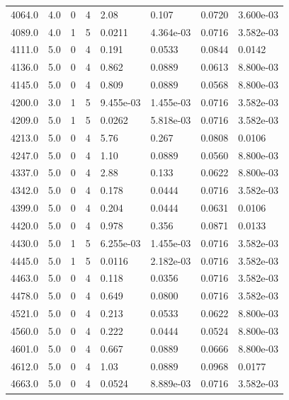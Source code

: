 \documentclass[preview]{standalone}
\begin{document}
{{{{\begin{tabular}{L{1.2cm}C{1.2cm} C{0.3cm}C{0.5cm} C{1.4cm}C{1.4cm} C{1.4cm}C{1.4cm}}
  4064.0  &   4.0  & 0     &  4 &  2.08  & 0.107  & 0.0720 &  3.600e-03   \\ 
  4089.0  &   4.0  & 1     &  5 &  0.0211  & 4.364e-03  & 0.0716 &  3.582e-03   \\ 
  4111.0  &   5.0  & 0     &  4 &  0.191  & 0.0533  & 0.0844 &  0.0142   \\ 
  4136.0  &   5.0  & 0     &  4 &  0.862  & 0.0889  & 0.0613 &  8.800e-03   \\ 
  4145.0  &   5.0  & 0     &  4 &  0.809  & 0.0889  & 0.0568 &  8.800e-03   \\ 
  4200.0  &   3.0  & 1     &  5 &  9.455e-03  & 1.455e-03  & 0.0716 &  3.582e-03   \\ 
  4209.0  &   5.0  & 1     &  5 &  0.0262  & 5.818e-03  & 0.0716 &  3.582e-03   \\ 
  4213.0  &   5.0  & 0     &  4 &  5.76  & 0.267  & 0.0808 &  0.0106   \\ 
  4247.0  &   5.0  & 0     &  4 &  1.10  & 0.0889  & 0.0560 &  8.800e-03   \\ 
  4337.0  &   5.0  & 0     &  4 &  2.88  & 0.133  & 0.0622 &  8.800e-03   \\ 
  4342.0  &   5.0  & 0     &  4 &  0.178  & 0.0444  & 0.0716 &  3.582e-03   \\ 
  4399.0  &   5.0  & 0     &  4 &  0.204  & 0.0444  & 0.0631 &  0.0106   \\ 
  4420.0  &   5.0  & 0     &  4 &  0.978  & 0.356  & 0.0871 &  0.0133   \\ 
  4430.0  &   5.0  & 1     &  5 &  6.255e-03  & 1.455e-03  & 0.0716 &  3.582e-03   \\ 
  4445.0  &   5.0  & 1     &  5 &  0.0116  & 2.182e-03  & 0.0716 &  3.582e-03   \\ 
  4463.0  &   5.0  & 0     &  4 &  0.118  & 0.0356  & 0.0716 &  3.582e-03   \\ 
  4478.0  &   5.0  & 0     &  4 &  0.649  & 0.0800  & 0.0716 &  3.582e-03   \\ 
  4521.0  &   5.0  & 0     &  4 &  0.213  & 0.0533  & 0.0622 &  8.800e-03   \\ 
  4560.0  &   5.0  & 0     &  4 &  0.222  & 0.0444  & 0.0524 &  8.800e-03   \\ 
  4601.0  &   5.0  & 0     &  4 &  0.667  & 0.0889  & 0.0666 &  8.800e-03   \\ 
  4612.0  &   5.0  & 0     &  4 &  1.03  & 0.0889  & 0.0968 &  0.0177   \\ 
  4663.0  &   5.0  & 0     &  4 &  0.0524  & 8.889e-03  & 0.0716 &  3.582e-03   \\ 

\end{tabular}}}}}
\end{document}
